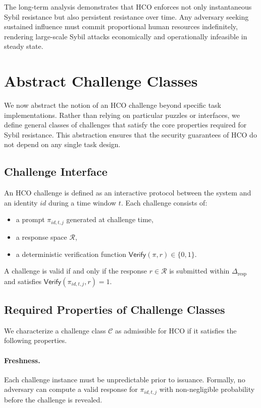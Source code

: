 \documentclass[sigconf,nonacm]{acmart}
\begin{document}
The long-term analysis demonstrates that HCO enforces not only instantaneous Sybil resistance but also persistent resistance over time. Any adversary seeking sustained influence must commit proportional human resources indefinitely, rendering large-scale Sybil attacks economically and operationally infeasible in steady state.


\section{Abstract Challenge Classes}

We now abstract the notion of an HCO challenge beyond specific task implementations. Rather than relying on particular puzzles or interfaces, we define general classes of challenges that satisfy the core properties required for Sybil resistance. This abstraction ensures that the security guarantees of HCO do not depend on any single task design.

\subsection{Challenge Interface}

An HCO challenge is defined as an interactive protocol between the system and an identity $id$ during a time window $t$. Each challenge consists of:
\begin{itemize}
	\item a prompt $\pi_{id,t,j}$ generated at challenge time,
	\item a response space $\mathcal{R}$,
	\item a deterministic verification function $\mathsf{Verify}(\pi, r) \in \{0,1\}$.
\end{itemize}

A challenge is valid if and only if the response $r \in \mathcal{R}$ is submitted within $\Delta_{\mathrm{resp}}$ and satisfies $\mathsf{Verify}(\pi_{id,t,j}, r) = 1$.

\subsection{Required Properties of Challenge Classes}

We characterize a challenge class $\mathcal{C}$ as admissible for HCO if it satisfies the following properties.

\paragraph{Freshness.}
Each challenge instance must be unpredictable prior to issuance. Formally, no adversary can compute a valid response for $\pi_{id,t,j}$ with non-negligible probability before the challenge is revealed.
\end{document}
